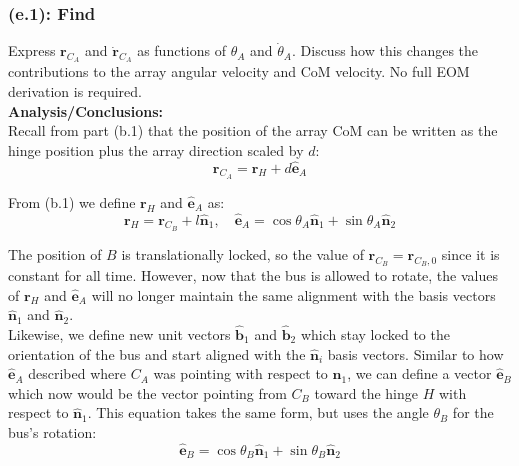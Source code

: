 \documentclass[titlepage]{article}
\begin{document}
\subsubsection*{(e.1): Find}
Express $\boldsymbol{r}_{C_A}$ and $\dot{\boldsymbol{r}}_{C_A}$ as functions of $\theta_A$ and $\dot{\theta}_A$. Discuss how this changes the contributions to the array angular velocity and CoM velocity. No full EOM derivation is required.\\

\textbf{Analysis/Conclusions:}\\
Recall from part (b.1) that the position of the array CoM can be written as the hinge position plus the array direction scaled by $d$:
\begin{equation}
	\boldsymbol{r}_{C_A}=\boldsymbol{r}_H+d\hat{\boldsymbol{e}}_A
\end{equation}

From (b.1) we define $\boldsymbol{r}_H$ and $\hat{\boldsymbol{e}}_A$ as:
\begin{equation}
	\boldsymbol{r}_H=\boldsymbol{r}_{C_B}+l\hat{\boldsymbol{n}}_1,\quad \hat{\boldsymbol{e}}_A=\cos\theta_A\hat{\boldsymbol{n}}_1+\sin\theta_A\hat{\boldsymbol{n}}_2
\end{equation}

The position of $B$ is translationally locked, so the value of $\boldsymbol{r}_{C_B}=\boldsymbol{r}_{C_B,0}$ since it is constant for all time. However, now that the bus is allowed to rotate, the values of $\boldsymbol{r}_H$ and $\hat{\boldsymbol{e}}_A$ will no longer maintain the same alignment with the basis vectors $\hat{\boldsymbol{n}}_1$ and $\hat{\boldsymbol{n}}_2$.\\

Likewise, we define new unit vectors $\hat{\boldsymbol{b}}_1$ and $\hat{\boldsymbol{b}}_2$ which stay locked to the orientation of the bus and start aligned with the $\hat{\boldsymbol{n}}_i$ basis vectors. Similar to how $\hat{\boldsymbol{e}}_A$ described where $C_A$ was pointing with respect to $\hat{\boldsymbol{n}}_1$, we can define a vector $\hat{\boldsymbol{e}}_B$ which now would be the vector pointing from $C_B$ toward the hinge $H$ with respect to $\hat{\boldsymbol{n}}_1$. This equation takes the same form, but uses the angle $\theta_B$ for the bus's rotation:
\begin{equation}
	\hat{\boldsymbol{e}}_B=\cos\theta_B\hat{\boldsymbol{n}}_1+\sin\theta_B\hat{\boldsymbol{n}}_2
\end{equation}
\end{document}
